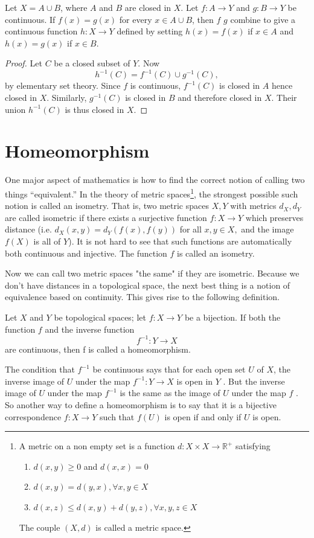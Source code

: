 \begin{theorem}\label{pasting}
Let $X=A\cup B$, where $A$ and $B$ are closed in $X$. Let $f:A\rightarrow Y$ and $g:B\rightarrow Y$ be continuous. If $f(x)=g(x)$ for every $x\in A\cup B$, then $f$  $g$ combine to give a continuous function $h:X\rightarrow Y$ defined by setting $h(x)=f(x)$ if $x\in A$ and $h(x)=g(x)$ if $x\in B$.
\end{theorem}
\begin{proof}
Let $C$ be a closed subset of $Y$. Now
$$h^{-1}(C)= f^{-1}(C)\cup g^{-1}(C),$$
by elementary set theory. Since $f$ is continuous, $f^{-1}(C)$ is closed in $A$ hence closed in $X$. Similarly, $g^{-1}(C)$ is closed in $B$ and therefore closed in $X$. Their union $h^{-1}(C)$ is thus closed in $X$.

\end{proof}

\section{Homeomorphism}

One major aspect of mathematics is how to find the correct notion of calling two things “equivalent.” In the theory of metric spaces\footnote{A metric on a non empty set is a function  $d: X\times X \rightarrow \mathbb{R}^+$ satisfying
\begin{enumerate}
  \item $d(x,y)\geq0$ and $d(x,x)=0$
  \item $d(x,y)=d(y,x), \forall x,y\in X$
  \item $d(x,z)\leq d(x,y)+d(y,z), \forall x,y,z\in X$
\end{enumerate}
The couple $(X,d)$ is called a metric space.}, the strongest possible such notion is called an isometry. That is, two metric spaces $X, Y$ with metrics $d_X, d_Y$ are called isometric if there exists a surjective function $f: X \to Y$ which preserves distance (i.e. $d_X(x,y) = d_Y(f(x), f(y))$ for all $x,y \in X,$ and the image $f(X)$ is all of $Y$). It is not hard to see that such functions are automatically both continuous and injective. The function $f$ is called an isometry.

Now we can call two metric spaces "the same" if they are isometric. Because we don't have distances in a topological space, the next best thing is a notion of equivalence based on continuity. This gives rise to the following definition.
\begin{definition}
Let $X$ and $Y$ be topological spaces; let $f : X\rightarrow Y$ be a bijection. If both the function $f$ and the inverse function
$$f^{-1}: Y\rightarrow X$$
are continuous, then f is called a homeomorphism.
\end{definition}

The condition that $f^{-1}$ be continuous says that for each open set $U$ of $X$, the inverse image of $U$ under the map $f^{-1}: Y\rightarrow X$ is open in $Y$ . But the inverse image of $U$ under the map $f^{-1}$ is the same as the image of $U$ under the map $f$ . So another way to define a homeomorphism is to say that it is a bijective
correspondence $f : X\rightarrow Y$ such that $f(U)$ is open if and only if $U$ is open.
